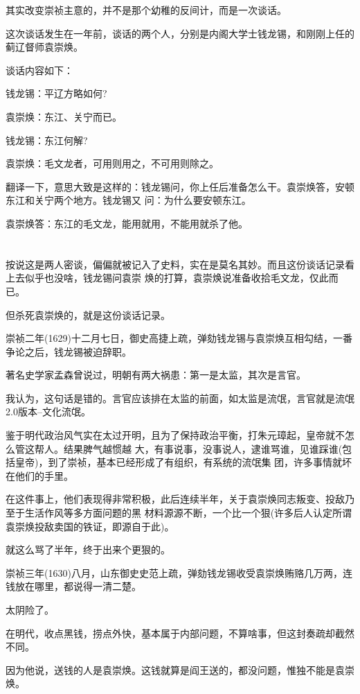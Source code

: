 \documentclass[11pt,a4paper,onecolumn]{article}
\begin{document}
其实改变崇祯主意的，并不是那个幼稚的反间计，而是一次谈话。

这次谈话发生在一年前，谈话的两个人，分别是内阁大学士钱龙锡，和刚刚上任的蓟辽督师袁崇焕。

谈话内容如下：

钱龙锡：平辽方略如何?

袁崇焕：东江、关宁而已。

钱龙锡：东江何解?

袁崇焕：毛文龙者，可用则用之，不可用则除之。

翻译一下，意思大致是这样的：钱龙锡问，你上任后准备怎么干。袁崇焕答，安顿东江和关宁两个地方。钱龙锡又
问：为什么要安顿东江。

袁崇焕答：东江的毛文龙，能用就用，不能用就杀了他。

\section[\thesection]{}

按说这是两人密谈，偏偏就被记入了史料，实在是莫名其妙。而且这份谈话记录看上去似乎也没啥，钱龙锡问袁崇
焕的打算，袁崇焕说准备收拾毛文龙，仅此而已。

但杀死袁崇焕的，就是这份谈话记录。

崇祯二年(1629)十二月七日，御史高捷上疏，弹劾钱龙锡与袁崇焕互相勾结，一番争论之后，钱龙锡被迫辞职。

著名史学家孟森曾说过，明朝有两大祸患：第一是太监，其次是言官。

我认为，这句话是错的。言官应该排在太监的前面，如太监是流氓，言官就是流氓2.0版本--文化流氓。

鉴于明代政治风气实在太过开明，且为了保持政治平衡，打朱元璋起，皇帝就不怎么管这帮人。结果脾气越惯越
大，有事说事，没事说人，逮谁骂谁，见谁踩谁(包括皇帝)，到了崇祯，基本已经形成了有组织，有系统的流氓集
团，许多事情就坏在他们的手里。

在这件事上，他们表现得非常积极，此后连续半年，关于袁崇焕同志叛变、投敌乃至于生活作风等多方面问题的黑
材料源源不断，一个比一个狠(许多后人认定所谓袁崇焕投敌卖国的铁证，即源自于此)。

就这么骂了半年，终于出来个更狠的。

崇祯三年(1630)八月，山东御史史范上疏，弹劾钱龙锡收受袁崇焕贿赂几万两，连钱放在哪里，都说得一清二楚。

太阴险了。

在明代，收点黑钱，捞点外快，基本属于内部问题，不算啥事，但这封奏疏却截然不同。

因为他说，送钱的人是袁崇焕。这钱就算是阎王送的，都没问题，惟独不能是袁崇焕。
\end{document}

